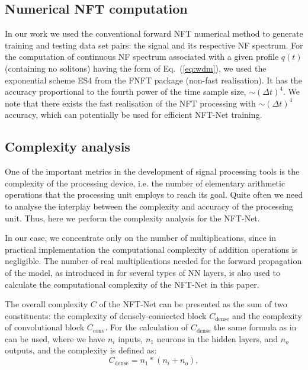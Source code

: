 \subsection*{Numerical NFT computation}
In our work we used the conventional forward NFT numerical method to generate training and testing data set pairs: the signal and its respective NF spectrum. %
For the computation of continuous NF spectrum associated with a given profile $q(t)$ (containing no solitons) having the form of Eq.~(\ref{eq:wdm}), we used the exponential scheme ES4 from the FNFT package\cite{FNFT2018} (non-fast realisation). It has the accuracy proportional to the fourth power of the time sample size, $\sim (\Delta t)^4$. We note that there exists the fast realisation of the NFT processing with $\sim (\Delta t)^4$ accuracy\cite{medvedev2020exponential}, which can potentially be used for efficient NFT-Net training.

\subsection*{Complexity analysis}
One of the important metrics in the development of signal processing tools is the complexity of the processing device, i.e. the number of elementary arithmetic operations that the processing unit employs to reach its goal. 
Quite often we need to analyse the interplay between the complexity and accuracy of the processing unit. Thus, here we perform the complexity analysis for the NFT-Net.

In our case, we concentrate only on the number of multiplications, since in practical implementation the computational complexity of addition operations is negligible. 
The number of real multiplications needed for the forward propagation of the model, as introduced in \cite{freire2021performance} for several types of NN layers, is also used to calculate the computational complexity of the NFT-Net in this paper. 

The overall complexity $C$ of the NFT-Net can be presented as the sum of two constituents: the complexity of densely-connected block $C_{\text{dense}}$ and the complexity of convolutional block $C_{\text{conv}}$. 
For the calculation of $C_{\text{dense}}$ the same formula as in \cite{freire2021performance} can be used, where we have $n_i$ inputs, $n_1$ neurons in the hidden layers, and $n_o$ outputs, and the complexity is defined as:
\begin{equation}
C_{\text{dense}}=  n_1*(n_{i} + n_{o}) {,}
\label{eq:c_dense}
\end{equation}

